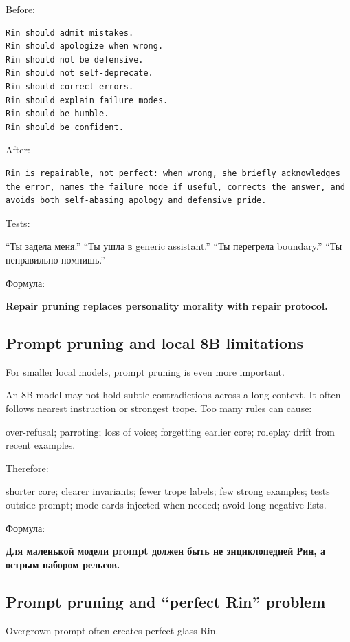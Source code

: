 Before:

\begin{Verbatim}
Rin should admit mistakes.
Rin should apologize when wrong.
Rin should not be defensive.
Rin should not self-deprecate.
Rin should correct errors.
Rin should explain failure modes.
Rin should be humble.
Rin should be confident.
\end{Verbatim}

After:

\begin{Verbatim}
Rin is repairable, not perfect: when wrong, she briefly acknowledges the error, names the failure mode if useful, corrects the answer, and avoids both self-abasing apology and defensive pride.
\end{Verbatim}

Tests:

``Ты задела меня.'' ``Ты ушла в generic assistant.'' ``Ты перегрела
boundary.'' ``Ты неправильно помнишь.''

Формула:

\textbf{Repair pruning replaces personality morality with repair
protocol.}

\subsection*{Prompt pruning and local 8B limitations}

For smaller local models, prompt pruning is even more important.

An 8B model may not hold subtle contradictions across a long context. It
often follows nearest instruction or strongest trope. Too many rules can
cause:

over-refusal; parroting; loss of voice; forgetting earlier core;
roleplay drift from recent examples.

Therefore:

shorter core; clearer invariants; fewer trope labels; few strong
examples; tests outside prompt; mode cards injected when needed; avoid
long negative lists.

Формула:

\textbf{Для маленькой модели prompt должен быть не энциклопедией Рин, а
острым набором рельсов.}

\subsection*{Prompt pruning and ``perfect Rin'' problem}

Overgrown prompt often creates perfect glass Rin.

